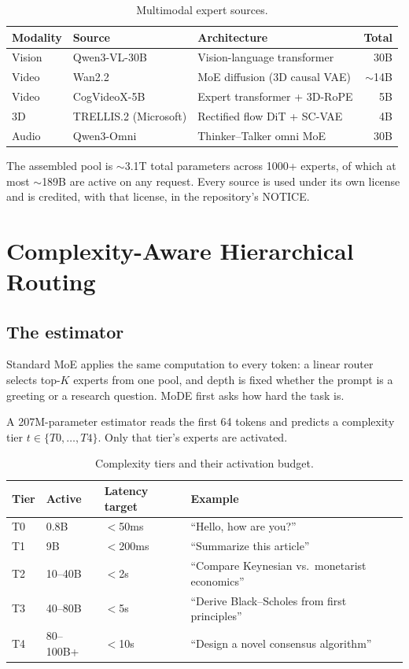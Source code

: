 \documentclass[11pt,a4paper]{article}
\begin{document}
\begin{table}[H]
\centering
\caption{Multimodal expert sources.}
\begin{tabular}{lllr}
\toprule
\textbf{Modality} & \textbf{Source} & \textbf{Architecture} & \textbf{Total} \\
\midrule
Vision & Qwen3-VL-30B          & Vision-language transformer   & 30B \\
Video  & Wan2.2                & MoE diffusion (3D causal VAE) & $\sim$14B \\
Video  & CogVideoX-5B          & Expert transformer + 3D-RoPE  & 5B \\
3D     & TRELLIS.2 (Microsoft) & Rectified flow DiT + SC-VAE   & 4B \\
Audio  & Qwen3-Omni            & Thinker--Talker omni MoE      & 30B \\
\bottomrule
\end{tabular}
\end{table}

The assembled pool is $\sim$3.1T total parameters across 1000+ experts, of which at most
$\sim$189B are active on any request. Every source is used under its own license and is
credited, with that license, in the repository's NOTICE.

\section{Complexity-Aware Hierarchical Routing}

\subsection{The estimator}

Standard MoE applies the same computation to every token: a linear router selects
top-$K$ experts from one pool, and depth is fixed whether the prompt is a greeting or a
research question. MoDE first asks how hard the task is.

A 207M-parameter estimator reads the first 64 tokens and predicts a complexity tier
$t \in \{T0,\dots,T4\}$. Only that tier's experts are activated.

\begin{table}[H]
\centering
\caption{Complexity tiers and their activation budget.}
\begin{tabular}{llll}
\toprule
\textbf{Tier} & \textbf{Active} & \textbf{Latency target} & \textbf{Example} \\
\midrule
T0 & 0.8B      & $<$50ms  & ``Hello, how are you?'' \\
T1 & 9B        & $<$200ms & ``Summarize this article'' \\
T2 & 10--40B   & $<$2s    & ``Compare Keynesian vs.\ monetarist economics'' \\
T3 & 40--80B   & $<$5s    & ``Derive Black--Scholes from first principles'' \\
T4 & 80--100B+ & $<$10s   & ``Design a novel consensus algorithm'' \\
\bottomrule
\end{tabular}
\end{table}
\end{document}
